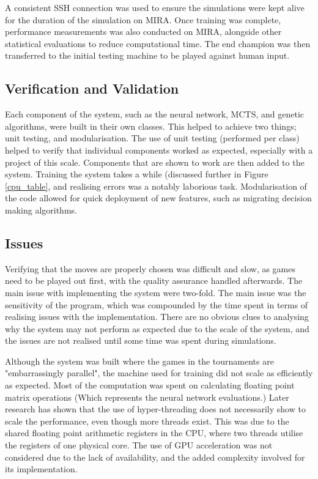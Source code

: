 \documentclass[12pt,a4paper]{article}
\begin{document}
        A consistent SSH connection was used to ensure the simulations were kept alive for the duration of the simulation on MIRA. Once training was complete, performance measurements was also conducted on MIRA, alongside other statistical evaluations to reduce computational time. The end champion was then transferred to the initial testing machine to be played against human input.

    \subsection{Verification and Validation}

        Each component of the system, such as the neural network, MCTS, and genetic algorithms, were built in their own classes. This helped to achieve two things; unit testing, and modularisation. The use of unit testing (performed per class) helped to verify that individual components worked as expected, especially with a project of this scale. Components that are shown to work are then added to the system. Training the system takes a while (discussed further in Figure \ref{cpu_table}, and realising errors was a notably laborious task. Modularisation of the code allowed for quick deployment of new features, such as migrating decision making algorithms.


    \subsection{Issues}
        Verifying that the moves are properly chosen was difficult and slow, as games need to be played out first, with the quality assurance handled afterwards. The main issue with implementing the system were two-fold. The main issue was the sensitivity of the program, which was compounded by the time spent in terms of realising issues with the implementation. There are no obvious clues to analysing why the system may not perform as expected due to the scale of the system, and the issues are not realised until some time was spent during simulations. 

        Although the system was built where the games in the tournaments are "embarrassingly parallel", the machine used for training did not scale as efficiently as expected. Most of the computation was spent on calculating floating point matrix operations (Which represents the neural network evaluations.) Later research has shown that the use of hyper-threading does not necessarily show to scale the performance, even though more threads exist. \cite{leng_empirical_2002} This was due to the shared floating point arithmetic registers in the CPU, where two threads utilise the registers of one physical core. The use of GPU acceleration was not considered due to the lack of availability, and the added complexity involved for its implementation. 
    
\end{document}
